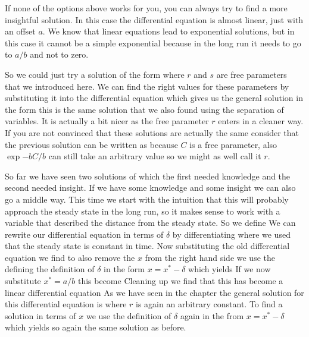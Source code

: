 If none of the options above works for you, you can always try to find a more insightful solution. In this case the differential equation is almost linear, just with an offset $a$. We know that linear equations lead to exponential solutions, but in this case it cannot be a simple exponential because in the long run it needs to go to $a/b$ and not to zero.  

So we could just try a solution of the form 
where $r$ and $s$ are free parameters that we introduced here. We can find the right values for these parameters by substituting it into the differential equation 
which gives us the general solution in the form 
this is the same solution that we also found using the separation of variables. It is actually a bit nicer as the free parameter $r$ enters in a cleaner way. If you are not convinced that these solutions are actually the same consider that the previous solution can be written as   
because $C$ is a free parameter, also $\exp{-bC}/b$ can still take an arbitrary value so we might as well call it $r$. 

So far we have seen two solutions of which the first needed knowledge and the second needed insight. If we have some knowledge and some insight we can also go a middle way. This time we start with the intuition that this will probably approach the steady state in the long run, so it makes sense to work with a variable that described the distance from the steady state. So we define 
We can rewrite our differential equation in terms of $\delta$ by differentiating 
where we used that the steady state is constant in time. Now substituting the old differential equation we find 
to also remove the $x$ from the right hand side we use the defining the definition of $\delta$ in the form $x=x^*-\delta$ which yields 
If we now substitute $x^*=a/b$ this become 
Cleaning up we find that this has become a linear differential equation 
As we have seen in the chapter the general solution for this differential equation is 
where $r$ is again an arbitrary constant. To find a solution in terms of $x$ we use the definition of $\delta$ again in the from $x=x^*-\delta$ which yields 
so again the same solution as before. 


